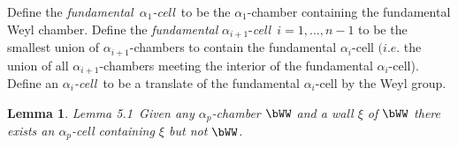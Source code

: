 \documentclass{memo-l}
\newtheorem{lemma}[theorem]{Lemma}
\theoremstyle{definition}
\theoremstyle{remark}
\numberwithin{section}{chapter}
\numberwithin{equation}{chapter}
\begin{document}
   Define the {\it fundamental\ ${\alpha}_{1}$-cell}\ to be the
${\alpha}_{1}$-chamber containing the fundamental Weyl chamber.  Define the
{\it fundamental} ${\alpha}_{i+1}$-{\it cell}\ $i = 1,\ldots ,{n-1}$ to be
the smallest union of ${\alpha}_{i+1}$-chambers to contain the fundamental
${\alpha}_{i}$-cell $(i.e$.  the union of all ${\alpha}_{i+1}$-chambers
meeting the interior of the fundamental ${\alpha}_{i}$-cell).  Define an
{\it ${\alpha}_{i}$-cell}\ to be a translate of the fundamental
${\alpha}_{i}$-cell by the Weyl group.

\begin{lemma}{Lemma 5.1}\ Given any ${\alpha}_{p}$-chamber
$\bWW$ and a wall ${\xi}$ of $\bWW$ there
exists an ${\alpha}_{p}$-cell containing ${\xi}$ but not $\bWW$.
\end{lemma}

\medpagebreak
\end{document}
